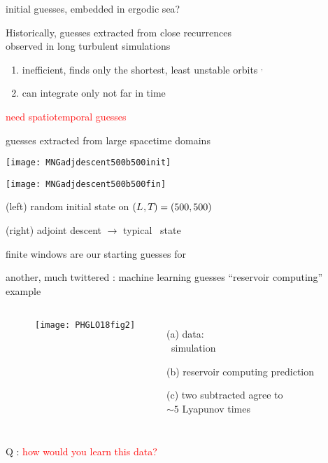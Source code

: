 \begin{frame}{initial guesses, embedded in ergodic sea?}
\begin{block}{Historically, }
guesses extracted from close recurrences \\
observed in long turbulent simulations
\end{block}
\bigskip\bigskip
            \begin{enumerate}
              \item
inefficient, finds only the shortest, least unstable orbits%
$^,$
              \item
can integrate only not far in time
            \end{enumerate}

\vfill\hfill\textcolor{red}{\huge need spatiotemporal guesses}
\end{frame}

\begin{frame}{guesses extracted from large spacetime domains}
\begin{minipage}[height=.45\textwidth]{.45\textwidth}
\centering %
\texttt{[image: MNGadjdescent500b500init]}
\end{minipage}
\begin{minipage}[height=.45\textwidth]{.45\textwidth}
\centering %
\texttt{[image: MNGadjdescent500b500fin]}
\end{minipage}

(left) random initial state on
$({L_{}},{T_{}})=(500,500)$

(right) adjoint descent $\to$ typical \KS\ state

\vfill\hfill
finite windows are our starting guesses for \twots
\end{frame}

\begin{frame}{another, much twittered : machine learning guesses}
``reservoir computing'' example

\bigskip

 \begin{columns}
~~~~~~\texttt{[image: PHGLO18fig2]}
 \begin{itemize}
 \item[(a)] data: \\ \KS\ simulation
 \item[(b)] reservoir computing prediction
 \item[(c)] two subtracted agree to \\
            $\sim 5$ Lyapunov times
 \end{itemize}
 \end{columns}
\vfill {\Large Q : \textcolor{red}{how would you learn this data?}}
\end{frame}

